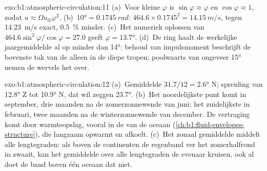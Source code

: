 \begin{solution}{exo:b1:atmospheric-circulation:11}
(a)~Voor kleine $\varphi$ is $\sin\varphi \approx \varphi$ en $\cos\varphi \approx 1$,
zodat $u \approx \Omega a_\oplus\varphi^2$. (b)~$\ang{10} = \qty{0.1745}{rad}$:
$464.6 \times 0.1745^2 = \qty{14.15}{m/s}$, tegen \qty{14.23}{m/s} exact,
\qty{0.5}{\percent} minder. (c)~Het numeriek oplossen van $464.6\sin^2\varphi/\cos\varphi = 27.0$
geeft $\varphi = \ang{13.7}$. (d)~De ring haalt de werkelijke jaargemiddelde  al op minder dan \ang{14}: behoud van impulsmoment beschrijft de bovenste tak van de  alleen in de diepe tropen; poolwaarts van ongeveer \ang{15} nemen de wervels het over.
\end{solution}

\begin{solution}{exo:b1:atmospheric-circulation:12}
(a)~Gemiddelde $31.7/12 = \ang{2.6}$ N; spreiding van \ang{12.8} Z tot \ang{10.9} N, dat wil zeggen
\ang{23.7}. (b)~Het noordelijkste punt komt in september, drie maanden na de zomerzonnewende van juni; het zuidelijkste in februari, twee maanden na de winterzonnewende van december. De vertraging komt door warmteopslag, vooral in de  van de oceaan (\cref{ch:b1:fluid-envelopes-structure}), die langzaam opwarmt en afkoelt. (c)~Het zonaal gemiddelde middelt alle lengtegraden: als boven de continenten de regenband ver het zomerhalfrond in zwaait, kan het gemiddelde over alle lengtegraden de evenaar kruisen, ook al doet de band boven één oceaan dat niet.
\end{solution}

